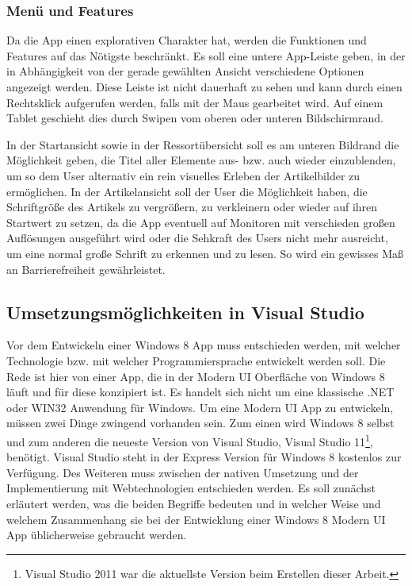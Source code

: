\documentclass[12pt,a4paper,bibtotoc,abstracton]{scrartcl}
\begin{document}
\subsubsection{Menü und Features}
\label{subsubsec:menuandproperties}
Da die App einen explorativen Charakter hat, werden die Funktionen und Features auf das Nötigste beschränkt. Es soll eine untere App-Leiste geben, in der in Abhängigkeit von der gerade gewählten Ansicht verschiedene Optionen angezeigt werden. Diese Leiste ist nicht dauerhaft zu sehen und kann durch einen Rechtsklick aufgerufen werden, falls mit der Maus gearbeitet wird. Auf einem Tablet geschieht dies durch Swipen vom oberen oder unteren Bildschirmrand.

In der Startansicht sowie in der Ressortübersicht soll es am unteren Bildrand die Möglichkeit geben, die Titel aller Elemente aus- bzw. auch wieder einzublenden, um so dem User alternativ ein rein visuelles Erleben der Artikelbilder zu ermöglichen. In der Artikelansicht soll der User die Möglichkeit haben, die Schriftgröße des Artikels zu vergrößern, zu verkleinern oder wieder auf ihren Startwert zu setzen, da die App eventuell auf Monitoren mit verschieden großen Auflösungen ausgeführt wird oder die Sehkraft des Users nicht mehr ausreicht, um eine normal große Schrift zu erkennen und zu lesen. So wird ein gewisses Maß an Barrierefreiheit gewährleistet. 


\subsection{Umsetzungsmöglichkeiten in Visual Studio}
\label{subsec:nativ_vs_web}
Vor dem Entwickeln einer Windows 8 App muss entschieden werden, mit welcher Technologie bzw. mit welcher Programmiersprache entwickelt werden soll. Die Rede ist hier von einer App, die in der Modern UI Oberfläche von Windows 8 läuft und für diese konzipiert ist. Es handelt sich nicht um eine klassische .NET oder WIN32 Anwendung für Windows. Um eine Modern UI App zu entwickeln, müssen zwei Dinge zwingend vorhanden sein. Zum einen wird Windows 8 selbst und zum anderen die neueste Version von Visual Studio, Visual Studio 11\footnote{Visual Studio 2011 war die aktuellste Version beim Erstellen dieser Arbeit.}, benötigt. Visual Studio steht in der Express Version für Windows 8 kostenlos zur Verfügung. Des Weiteren muss zwischen der nativen Umsetzung und der Implementierung mit Webtechnologien entschieden werden. Es soll zunächst erläutert werden, was die beiden Begriffe bedeuten und in welcher Weise und welchem Zusammenhang sie bei der Entwicklung einer Windows 8 Modern UI App üblicherweise gebraucht werden.
\end{document}
